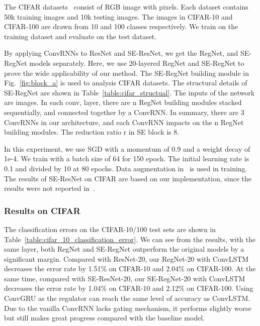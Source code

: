 \documentclass[journal,comsoc]{IEEEtran}
\begin{document}
The CIFAR datasets~\cite{Krizhevsky09} consist of RGB image with  pixels.
Each dataset contains 50k training images and 10k testing images. The images in CIFAR-10 and CIFAR-100 are drawn from 10 and 100 classes respectively. We train on the training dataset and evaluate on the test dataset. 


 By applying ConvRNNs to ResNet and SE-ResNet, we get the RegNet, and SE-RegNet models separately. Here, we use 20-layered RegNet and SE-RegNet to prove the wide applicability of our method. The SE-RegNet building module in Fig.~\ref{fig:block_a} is used to analysis CIFAR datasets. The structural details of SE-RegNet are shown in Table~\ref{table:cifar_structual}. The inputs of the network are  images. In each conv,  layer, there are n RegNet building modules stacked sequentially, and connected together by a ConvRNN. In summary, there are 3 ConvRNNs in our architecture, and each ConvRNN impacts on the n RegNet building modules.  The reduction ratio r in SE block is 8. 

In this experiment, we use SGD with a momentum of 0.9 and a weight decay of 1e-4. We train with a batch size of 64 for 150 epoch. The initial learning rate is 0.1 and divided by 10 at 80 epochs. Data augmentation in~\cite{DBLP:conf/aistats/2015} is used in training. The results of SE-ResNet on CIFAR are based on our implementation, since the results were not reported in~\cite{DBLP:journals/corr/abs-1709-01507}.

\subsubsection{Results on CIFAR}

The classification errors on the CIFAR-10/100 test sets are shown in Table~\ref{table:cifar_10_classification_error}.  We can see from the results, with the same layer, both RegNet and SE-RegNet outperform the original models by a significant margin. Compared with ResNet-20, our RegNet-20 with ConvLSTM decreases the error rate by 1.51\% on CIFAR-10 and 2.04\% on CIFAR-100. At the same time, compared with SE-ResNet-20, our SE-RegNet-20 with ConvLSTM decreases the error rate by 1.04\% on CIFAR-10 and 2.12\% on CIFAR-100. Using ConvGRU as the regulator can reach the same level of accuracy as ConvLSTM. Due to the vanilla ConvRNN lacks gating mechanism, it performs slightly worse but still makes great progress compared with the baseline model. 
\end{document}
